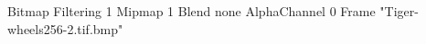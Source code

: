 {Bitmap
	{Filtering 1}
	{Mipmap 1}
	{Blend none}
	{AlphaChannel 0}
	{Frame "Tiger-wheels256-2.tif.bmp"}
}
